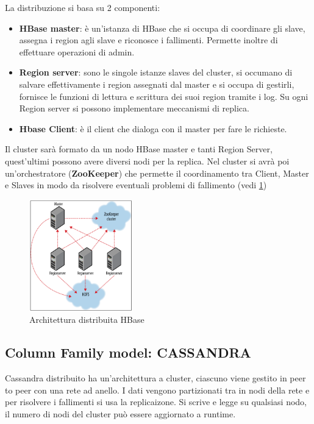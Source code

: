       La distribuzione si basa su 2 componenti:
      \begin{itemize}
            \item \textbf{HBase master}: è un'istanza di HBase che si occupa di
                  coordinare gli slave, assegna i region agli slave e riconosce i
                  fallimenti. Permette inoltre di effettuare operazioni di admin.
            \item \textbf{Region server}: sono le singole istanze slaves del cluster,
                  si occumano di salvare effettivamente i region assegnati dal master
                  e si occupa di gestirli, fornisce le funzioni di lettura e scrittura
                  dei suoi region tramite i log. Su ogni Region server si possono
                  implementare meccanismi di replica.
            \item \textbf{Hbase Client}: è il client che dialoga con il master per fare le
                  richieste.
      \end{itemize}
      Il cluster sarà formato da un nodo HBase master e tanti Region Server, quest'ultimi
      possono avere diversi nodi per la replica. Nel cluster si avrà poi un'orchestratore
      (\textbf{ZooKeeper}) che permette il coordinamento tra Client, Master e Slaves
      in modo da risolvere eventuali problemi di fallimento (vedi \ref{fig:dist_hbase})
      \begin{figure} [!ht]
            \centering
            \includegraphics[width=0.4\textwidth]{img/nosql/hbase_distribuited.png}
            \caption{Architettura distribuita HBase}
            \label{fig:dist_hbase}
      \end{figure}
      \subsection{Column Family model: CASSANDRA}
      Cassandra distribuito ha un'architettura a cluster, ciascuno viene gestito in peer
      to peer con una rete ad anello. I dati vengono partizionati tra in nodi della rete e
      per risolvere i fallimenti si usa la replicaizone. Si scrive e legge su qualsiasi
      nodo, il numero di nodi del cluster può essere aggiornato a runtime.

